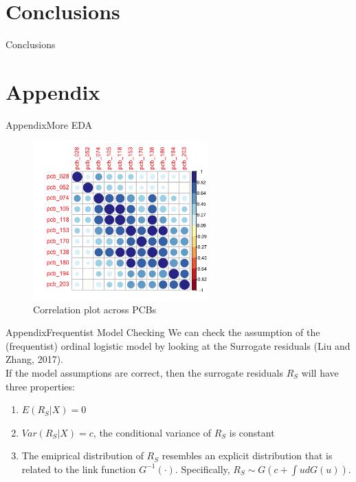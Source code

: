 \documentclass{beamer}\usepackage[]{graphicx}\usepackage[]{color}
\begin{document}

\section{Conclusions}
\begin{frame}{Conclusions}
\end{frame}

\appendix
\section{Appendix}
\begin{frame}{Appendix}{More EDA}
\begin{figure}
  \centering
  \includegraphics[width=0.6\textwidth]{corrplot_PCB.png}
\caption{Correlation plot across PCBs}
\label{fig:corrPCB}
\end{figure}
\end{frame}
\begin{frame}{Appendix}{Frequentist Model Checking}
We can check the assumption of the (frequentist) ordinal logistic model by looking at the Surrogate residuals (Liu and Zhang, 2017).\\
\medskip
If the model assumptions are correct, then the surrogate residuals $R_S$ will have three properties:
\begin{enumerate}
 \item $E(R_S|X)=0$
 \item $Var(R_S|X)=c$, the conditional variance of $R_S$ is constant
 \item The emiprical distribution of $R_S$ resembles an explicit distribution that is related to the link function $G^{-1}(\cdot)$. Specifically, $R_S\sim G(c+\int ud G(u))$.
\end{enumerate}
\end{frame}
\end{document}
